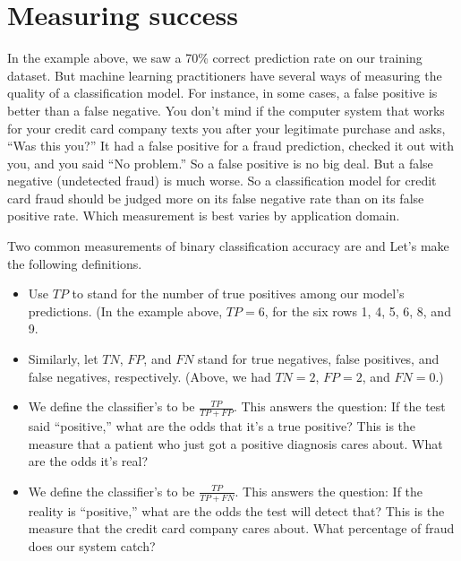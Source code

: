 \documentclass[letterpaper,10pt,english]{sphinxmanual}
\begin{document}
\section{Measuring success}
\label{\detokenize{chapter-17-machine-learning:measuring-success}}
In the example above, we saw a 70\% correct prediction rate on our training dataset.  But machine learning practitioners have several ways of measuring the quality of a classification model.  For instance, in some cases, a false positive is better than a false negative.  You don’t mind if the computer system that works for your credit card company texts you after your legitimate purchase and asks, “Was this you?”  It had a false positive for a fraud prediction, checked it out with you, and you said “No problem.”  So a false positive is no big deal.  But a false negative (undetected fraud) is much worse.  So a classification model for credit card fraud should be judged more on its false negative rate than on its false positive rate.  Which measurement is best varies by application domain.

Two common measurements of binary classification accuracy are  and   Let’s make the following definitions.
\begin{itemize}
\item {} 
Use \(TP\) to stand for the number of true positives among our model’s predictions.  (In the example above, \(TP=6\), for the six rows 1, 4, 5, 6, 8, and 9.

\item {} 
Similarly, let \(TN\), \(FP\), and \(FN\) stand for true negatives, false positives, and false negatives, respectively.  (Above, we had \(TN=2\), \(FP=2\), and \(FN=0\).)

\item {} 
We define the classifier’s  to be \(\frac{TP}{TP+FP}\).  This answers the question:  If the test said “positive,” what are the odds that it’s a true positive?  This is the measure that a patient who just got a positive diagnosis cares about.  What are the odds it’s real?

\item {} 
We define the classifier’s  to be \(\frac{TP}{TP+FN}\).  This answers the question:  If the reality is “positive,” what are the odds the test will detect that?  This is the measure that the credit card company cares about.  What percentage of fraud does our system catch?

\end{itemize}
\end{document}
